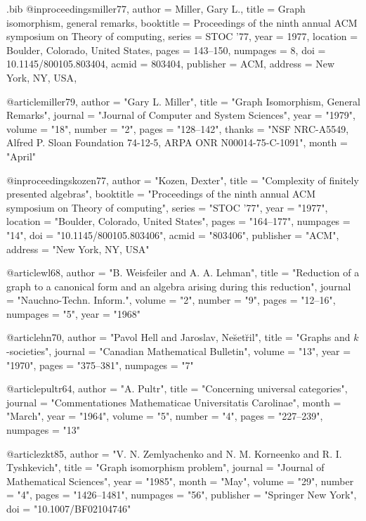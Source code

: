 \begin{filecontents*}{\jobname.bib}
@inproceedings{miller77,
 author = {Miller, Gary L.},
 title = {Graph isomorphism, general remarks},
 booktitle = {Proceedings of the ninth annual ACM symposium on Theory of
                  computing},
 series = {STOC '77},
 year = {1977},
 location = {Boulder, Colorado, United States},
 pages = {143--150},
 numpages = {8},
 doi = {10.1145/800105.803404},
 acmid = {803404},
 publisher = {ACM},
 address = {New York, NY, USA},
}


@article{miller79,
 author = "Gary L. Miller",
 title = "Graph Isomorphism, General Remarks",
 journal = "Journal of Computer and System Sciences",
 year = "1979",
 volume = "18",
 number = "2",
 pages = "128--142",
 thanks = "NSF NRC-A5549, Alfred P. Sloan Foundation 74-12-5, ARPA ONR
                  N00014-75-C-1091",
 month = "April"
}
                  
@inproceedings{kozen77,
 author = "Kozen, Dexter",
 title = "Complexity of finitely presented algebras",
 booktitle = "Proceedings of the ninth annual ACM symposium on Theory of
                  computing",
 series = "STOC '77",
 year = "1977",
 location = "Boulder, Colorado, United States",
 pages = "164--177",
 numpages = "14",
 doi = "10.1145/800105.803406",
 acmid = "803406",
 publisher = "ACM",
 address = "New York, NY, USA"
}

@article{wl68,
 author = "B. Weisfeiler and A. A. Lehman",
 title = "Reduction of a graph to a canonical form and an algebra arising
                  during this reduction",
 journal = "Nauchno-Techn. Inform.",
 volume = "2",
 number = "9",
 pages = "12--16",
 numpages = "5",
 year = "1968"
}

@article{hn70,
 author = "Pavol Hell and Jaroslav, Ne\u{s}et\u{r}il",
 title = "Graphs and $k$-societies",
 journal = "Canadian Mathematical Bulletin",
 volume = "13",
 year = "1970",
 pages = "375--381",
 numpages = "7"
}

@article{pultr64,
 author = "A. Pultr",
 title = "Concerning universal categories",
 journal = "Commentationes Mathematicae Universitatis Carolinae",
 month = "March",
 year = "1964",
 volume = "5",
 number = "4",
 pages = "227--239",
 numpages = "13"
}

@article{zkt85,
 author = "V. N. Zemlyachenko and N. M. Korneenko and R. I. Tyshkevich",
 title = "Graph isomorphism problem",
 journal = "Journal of Mathematical Sciences",
 year = "1985",
 month = "May",
 volume = "29",
 number = "4",
 pages = "1426--1481",
 numpages = "56",
 publisher = "Springer New York",
 doi = "10.1007/BF02104746"
}


\end{filecontents*}

